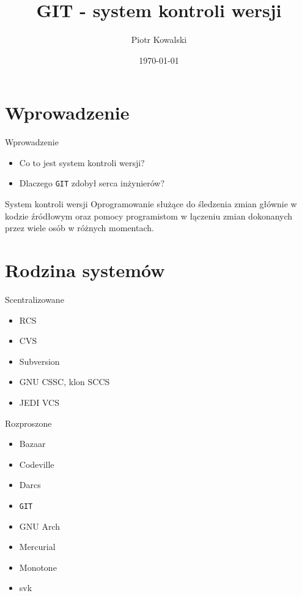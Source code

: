 \documentclass{beamer}
\title[GIT]{GIT - system kontroli wersji}
\author{Piotr Kowalski}
\institute{Wyższa Szkoła Informatyki Stosowanej i Zarządzania}
\date{\today}
\begin{document}

\begin{frame}
  \titlepage
\end{frame}


\section{Wprowadzenie}

\begin{frame}{Wprowadzenie}
\begin{itemize}
  \item Co to jest system kontroli wersji?
  \item Dlaczego \texttt{GIT} zdobył serca inżynierów?
\end{itemize}
\vskip 1cm
\begin{block}{System kontroli wersji}
Oprogramowanie służące do śledzenia zmian głównie w kodzie źródłowym oraz pomocy programistom w łączeniu zmian dokonanych przez wiele osób w różnych momentach.
\end{block}
\end{frame}


\section{Rodzina systemów}

\begin{frame}{Scentralizowane}
\begin{itemize}
  \item RCS
  \item CVS
  \item Subversion
  \item GNU CSSC, klon SCCS
  \item JEDI VCS
\end{itemize}
\end{frame}

\begin{frame}{Rozproszone}
\begin{itemize}
  \item Bazaar
  \item Codeville
  \item Darcs
  \item \texttt{GIT}
  \item GNU Arch
  \item Mercurial
  \item Monotone
  \item svk
\end{itemize}
\end{frame}
\end{document}
